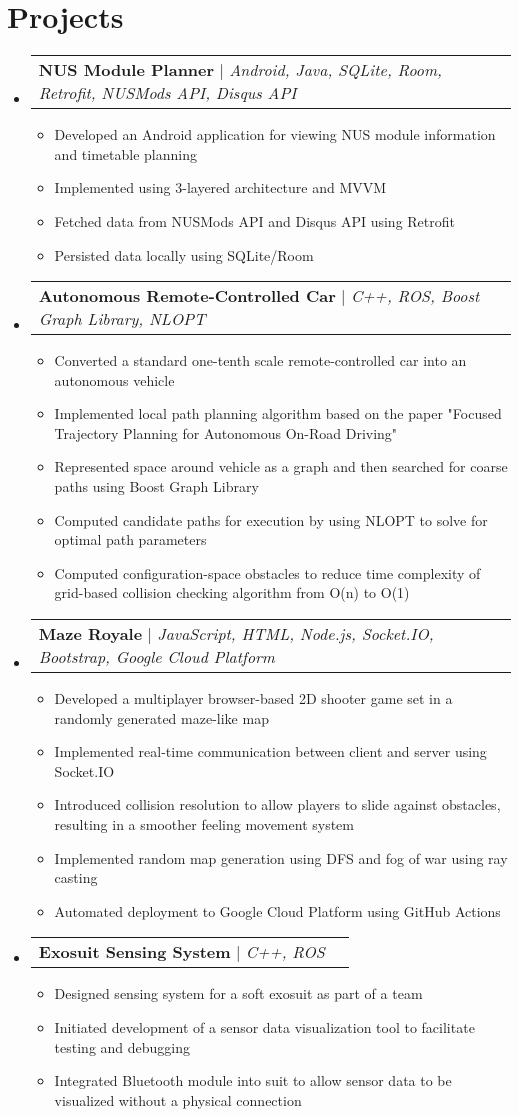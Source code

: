 \documentclass[letterpaper,11pt]{article}
\makeatletter
\newcommand{\resumeItem}[1]{
  \item\small{
    {#1 \vspace{-2pt}}
  }
}
\newcommand{\resumeProjectHeading}[2]{
    \item
    \begin{tabular*}{0.97\textwidth}{l@{\extracolsep{\fill}}r}
      \small#1 & #2 \\
    \end{tabular*}\vspace{-7pt}
}
\newcommand{\resumeSubHeadingListStart}{\begin{itemize}[leftmargin=0.15in, label={}]}
\newcommand{\resumeSubHeadingListEnd}{\end{itemize}}
\newcommand{\resumeItemListStart}{\begin{itemize}}
\newcommand{\resumeItemListEnd}{\end{itemize}\vspace{-5pt}}
\makeatother
\begin{document}
\section{Projects}
    \resumeSubHeadingListStart
      \resumeProjectHeading
          {\textbf{NUS Module Planner} $|$ \emph{Android, Java, SQLite, Room, Retrofit, NUSMods API, Disqus API}}{}
          \resumeItemListStart
            \resumeItem{Developed an Android application for viewing NUS module information and timetable planning}
            \resumeItem{Implemented using 3-layered architecture and MVVM}
            \resumeItem{Fetched data from NUSMods API and Disqus API using Retrofit}
            \resumeItem{Persisted data locally using SQLite/Room}
          \resumeItemListEnd
      \resumeProjectHeading
          {\textbf{Autonomous Remote-Controlled Car} $|$ \emph{C++, ROS, Boost Graph Library, NLOPT}}{}
          \resumeItemListStart
            \resumeItem{Converted a standard one-tenth scale remote-controlled car into an autonomous vehicle}
            \resumeItem{Implemented local path planning algorithm based on the paper "Focused Trajectory Planning for Autonomous On-Road Driving"}
            \resumeItem{Represented space around vehicle as a graph and then searched for coarse paths using Boost Graph Library}
            \resumeItem{Computed candidate paths for execution by using NLOPT to solve for optimal path parameters}
            \resumeItem{Computed configuration-space obstacles to reduce time complexity of grid-based collision checking algorithm from O(n) to O(1)}
          \resumeItemListEnd
      \resumeProjectHeading
          {\textbf{Maze Royale} $|$ \emph{JavaScript, HTML, Node.js, Socket.IO, Bootstrap, Google Cloud Platform}}{}
          \resumeItemListStart
            \resumeItem{Developed a multiplayer browser-based 2D shooter game set in a randomly generated maze-like map}
            \resumeItem{Implemented real-time communication between client and server using Socket.IO}
            \resumeItem{Introduced collision resolution to allow players to slide against obstacles, resulting in a smoother feeling movement system}
            \resumeItem{Implemented random map generation using DFS and fog of war using ray casting}
            \resumeItem{Automated deployment to Google Cloud Platform using GitHub Actions}
          \resumeItemListEnd
      \resumeProjectHeading
          {\textbf{Exosuit Sensing System} $|$ \emph{C++, ROS}}{}
          \resumeItemListStart
            \resumeItem{Designed sensing system for a soft exosuit as part of a team}
            \resumeItem{Initiated development of a sensor data visualization tool to facilitate testing and debugging}
            \resumeItem{Integrated Bluetooth module into suit to allow sensor data to be visualized without a physical connection}
          \resumeItemListEnd
    \resumeSubHeadingListEnd
\end{document}
